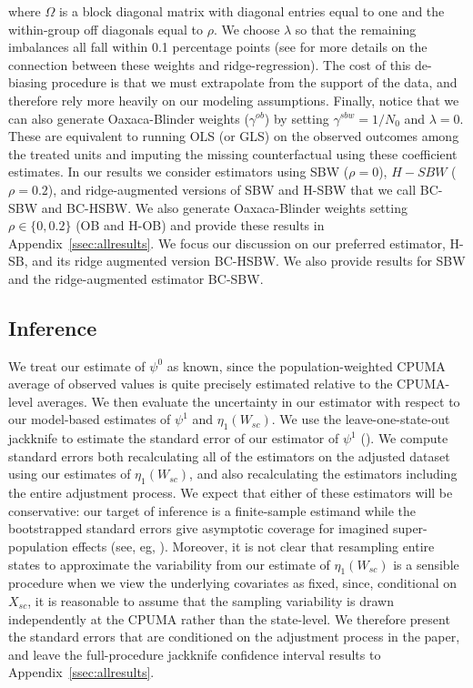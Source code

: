 \documentclass[12pt]{article}
\begin{document}
where $\Omega$ is a block diagonal matrix with diagonal entries equal to one and the within-group off diagonals equal to $\rho$. We choose $\lambda$ so that the remaining imbalances all fall within 0.1 percentage points (see \cite{ben2018augmented} for more details on the connection between these weights and ridge-regression). The cost of this de-biasing procedure is that we must extrapolate from the support of the data, and therefore rely more heavily on our modeling assumptions. Finally, notice that we can also generate Oaxaca-Blinder weights ($\gamma^{ob}$) by setting $\gamma^{sbw} = 1/N_0$ and $\lambda = 0$. These are equivalent to running OLS (or GLS) on the observed outcomes among the treated units and imputing the missing counterfactual using these coefficient estimates. In our results we consider estimators using SBW ($\rho = 0$), $H-SBW$ ($\rho = 0.2$), and ridge-augmented versions of SBW and H-SBW that we call BC-SBW and BC-HSBW. We also generate Oaxaca-Blinder weights setting $\rho \in \{0, 0.2\}$ (OB and H-OB) and provide these results in Appendix~\ref{ssec:allresults}. We focus our discussion on our preferred estimator, H-SB, and its ridge augmented version BC-HSBW. We also provide results for SBW and the ridge-augmented estimator BC-SBW.

\subsection{Inference}

We treat our estimate of $\psi^0$ as known, since the population-weighted CPUMA average of observed values is quite precisely estimated relative to the CPUMA-level averages. We then evaluate the uncertainty in our estimator with respect to our model-based estimates of $\psi^1$ and $\eta_1(W_{sc})$. We use the leave-one-state-out jackknife to estimate the standard error of our estimator of $\psi^1$ (\cite{cameron2015practitioner}). We compute standard errors both recalculating all of the estimators on the adjusted dataset using our estimates of $\eta_1(W_{sc})$, and also recalculating the estimators including the entire adjustment process. We expect that either of these estimators will be conservative: our target of inference is a finite-sample estimand while the bootstrapped standard errors give asymptotic coverage for imagined super-population effects (see, eg, \cite{imbens2015causal}). Moreover, it is not clear that resampling entire states to approximate the variability from our estimate of $\eta_1(W_{sc})$ is a sensible procedure when we view the underlying covariates as fixed, since, conditional on $X_{sc}$, it is reasonable to assume that the sampling variability is drawn independently at the CPUMA rather than the state-level. We therefore present the standard errors that are conditioned on the adjustment process in the paper, and leave the full-procedure jackknife confidence interval results to Appendix~\ref{ssec:allresults}. 
\end{document}
